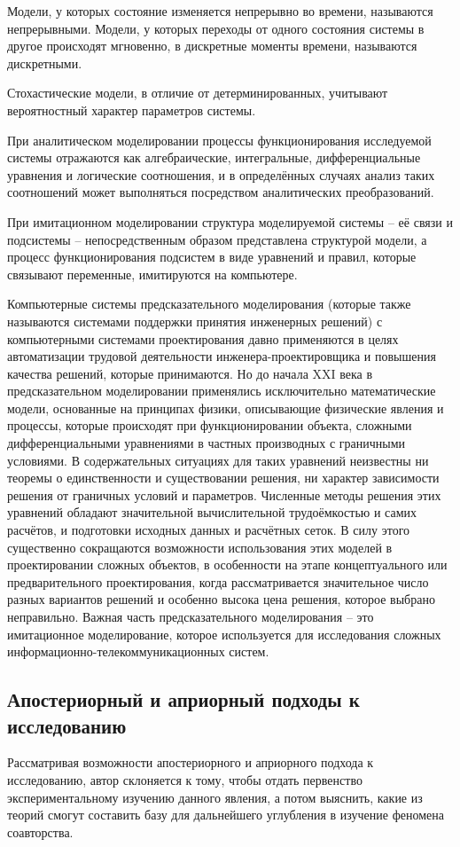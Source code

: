 Модели, у которых состояние изменяется непрерывно во времени, называются непрерывными. 
Модели, у которых переходы от одного состояния системы в другое происходят мгновенно, в дискретные моменты времени, называются дискретными.

Стохастические модели, в отличие от детерминированных, учитывают вероятностный характер параметров системы.

При аналитическом моделировании процессы функционирования исследуемой системы отражаются как алгебраические, интегральные, дифференциальные уравнения и логические соотношения, и в определённых случаях анализ таких соотношений может выполняться посредством аналитических преобразований.

При имитационном моделировании структура моделируемой системы -- её связи и подсистемы -- непосредственным образом представлена структурой модели, а процесс функционирования подсистем в виде уравнений и правил, которые связывают переменные, имитируются на компьютере.

Компьютерные системы предсказательного моделирования (которые также называются системами поддержки принятия инженерных решений) с компьютерными системами проектирования давно применяются в целях автоматизации трудовой деятельности инженера-проектировщика и повышения качества решений, которые принимаются. 
Но до начала XXI века в предсказательном моделировании применялись исключительно математические модели, основанные на принципах физики, описывающие физические явления и процессы, которые происходят при функционировании объекта, сложными дифференциальными уравнениями в частных производных с граничными условиями. 
В содержательных ситуациях для таких уравнений неизвестны ни теоремы о единственности и существовании решения, ни характер зависимости решения от граничных условий и параметров.
Численные методы решения этих уравнений обладают значительной вычислительной трудоёмкостью и самих расчётов, и подготовки исходных данных и расчётных сеток.
В силу этого существенно сокращаются возможности использования этих моделей в проектировании сложных объектов, в особенности на этапе концептуального или предварительного проектирования, когда рассматривается значительное число разных вариантов решений и особенно высока цена решения, которое выбрано неправильно. 
Важная часть предсказательного моделирования -- это имитационное моделирование, которое используется для исследования сложных информационно-телекоммуникационных систем.

\subsection{Апостериорный и априорный подходы к исследованию}
Рассматривая возможности апостериорного и априорного подхода к исследованию, автор склоняется к тому, чтобы отдать первенство экспериментальному изучению данного явления, а потом выяснить, какие из теорий смогут составить базу для дальнейшего углубления в изучение феномена соавторства.

